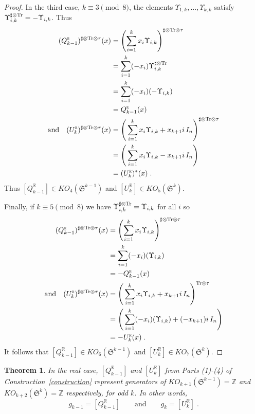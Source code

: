 \documentclass[12pt, reqno]{amsart}
\newtheorem{thm}{Theorem}[section]
\theoremstyle{definition}
\def\R{{\mathbb R}}
\def\Z{{\mathbb Z}}
\def\Up{{\Upsilon}}
\def\pr{^{\scriptscriptstyle \R}}
\def\sT{ ^{\sharp \otimes {\rm{Tr}}}}
\def\Ttau{ ^{\rm{Tr} \otimes \tau}}
\def\sTtau{^{\sharp \otimes {\rm{Tr}} \otimes \tau}}
\newcommand{\fS}{\mathfrak S}
\begin{document}
\begin{proof}
In the third case, $k \equiv 3 \pmod 8$, the elements $\Up_{1, k}, \dots, \Up_{k,k}$ satisfy $\Up_{i,k}\sT = - \Up_{i,k}$. Thus
\begin{align*}
	(Q\pr_{k-1}) \sTtau(x)   
		&= \left( \sum_{i = 1}^k x_i \Up_{i,k} \right) \sTtau \\
		&= \sum_{i = 1}^{k} (-x_i) \Up_{i,k}\sT\\
		&= \sum_{i = 1}^{k} (-x_i) ( - \Up_{i,k}) \\
		&= Q\pr_{k-1} (x) \;  \\
\text{and} \quad 
	(U\pr_k)\sTtau(x)   
		&= \left( \,  \sum_{i = 1}^{k} x_i \Up_{i,k}  + x_{k+1} i \, I_n \right) \sTtau \\
		&= \left( \,   \sum_{i = 1}^{k} x_i \Up_{i,k} - x_{k+1} i \, I_n \right)  \\
		&= (U_k\pr)^*(x) \; .
\end{align*}
Thus $[Q\pr_{k-1}] \in KO_4(\fS^{k-1})$ and $[U\pr_{k}] \in KO_5(\fS^{k})$.

Finally, if $k \equiv 5 \pmod 8$ we have $\Up_{i,k}\sT = \Up_{i,k}$ for all $i$ so
\begin{align*}
	(Q\pr_{k-1}) \sTtau(x)   
		&= \left( \sum_{i = 1}^k x_i \Up_{i,k} \right) \sTtau \\
		&= \sum_{i = 1}^{k} (-x_i) (  \Up_{i,k}) \\
		&= -Q\pr_{k-1} (x) \;  \\
\text{and} \quad 
	(U\pr_k)\sTtau(x)   
		&= \left( \,  \sum_{i = 1}^{k} x_i \Up_{i,k}  + x_{k+1} i \, I_n \right) \Ttau \\
		&= \left( \,  \sum_{i = 1}^{k} (-x_i) (\Up_{i,k})  + (-x_{k+1}) i \, I_n \right)  \\
		&= -U\pr_k(x) \; .
\end{align*}
It follows that $[Q\pr_{k-1}] \in KO_6(\fS^{k-1})$ and $[U\pr_{k}] \in KO_{7}(\fS^{k})$.
\end{proof}

\begin{thm} \label{main-thm}
In the real case, $[Q\pr_{k-1}]$ and $[U\pr_k]$ from Parts (1)-(4) of Construction~\ref{construction} represent generators of $KO_{k+1}(\fS^{k-1}) = \Z$ and $KO_{k+2}(\fS^k) = \Z$ respectively, for odd $k$. In other words,
$$g_{k-1} = [Q\pr_{k-1}] \qquad \text{and} \qquad g_k = [U\pr_k] \; .$$
\end{thm}
\end{document}
